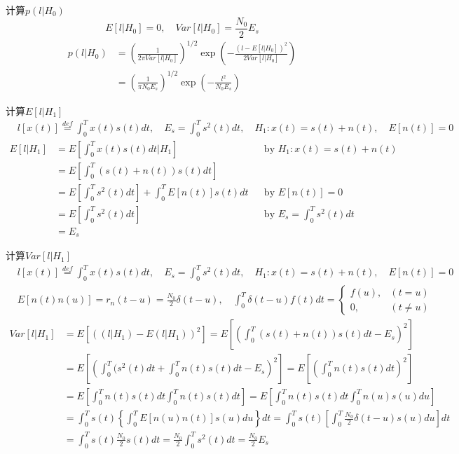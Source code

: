 \begin{frame}{计算$p(l|H_0)$}
\[ E[l|H_0]=0,\quad Var[l|H_0]=\frac{N_0}{2}E_s \]
\begin{align*}
p(l|H_0)&=\left(\frac{1}{2\pi Var[l|H_0]}\right)^{1/2}\exp\left(-\frac{(l-E[l|H_0])^2}{2Var[l|H_0]}\right)\\
&=\left(\frac{1}{\pi N_0E_s}\right)^{1/2}\exp\left(-\frac{l^2}{N_0E_s}\right)
\end{align*}
\end{frame}

\begin{frame}[shrink]{计算$E[l|H_1]$}
\begin{align*}
&l[x(t)]\mathop{=}\limits^{def}\int_{0}^{T}x(t)s(t)dt,\quad E_s=\int_{0}^{T}s^2(t)dt,\quad H_1:x(t)=s(t)+n(t), \quad E[n(t)]=0
\end{align*}
\begin{align*}
E[l|H_1]&=E\left[\int_{0}^{T}x(t)s(t)dt|H_1\right] &&\text{by }H_1: x(t)=s(t)+n(t)\\
&=E\left[\int_{0}^{T}(s(t)+n(t))s(t)dt\right]\\
&=E\left[\int_{0}^{T}s^2(t)dt\right]+\int_{0}^{T}E[n(t)]s(t)dt &&\text{by } E[n(t)]=0 \\
&=E\left[\int_{0}^{T}s^2(t)dt\right] &&\text{by } E_s=\int_{0}^{T}s^2(t)dt\\
&=E_s
\end{align*}
\end{frame}

\begin{frame}[shrink]{计算$Var[l|H_1]$}
\begin{align*}
&l[x(t)]\mathop{=}\limits^{def}\int_{0}^{T}x(t)s(t)dt,\quad E_s=\int_{0}^{T}s^2(t)dt,\quad H_1:x(t)=s(t)+n(t), \quad E[n(t)]=0\\
&E[n(t)n(u)]=r_n(t-u)=\frac{N_0}{2}\delta(t-u), \quad
\int_0^T\delta(t-u)f(t)dt=
\begin{cases}
f(u), & (t=u)\\
0, & (t\ne u) 
\end{cases}
\end{align*}
\begin{align*}
Var[l|H_1]&=E[((l|H_1)-E(l|H_1))^2]=E\left[\left(\int_{0}^{T}(s(t)+n(t))s(t)dt-E_s\right)^2\right]\\
&=E\left[\left(\int_{0}^{T}(s^2(t)dt+\int_{0}^{T}n(t)s(t)dt-E_s\right)^2\right]=E\left[\left(\int_{0}^{T}n(t)s(t)dt\right)^2\right]\\
&=E\left[\int_{0}^{T}n(t)s(t)dt\int_{0}^{T}n(t)s(t)dt\right]=E\left[\int_{0}^{T}n(t)s(t)dt\int_{0}^{T}n(u)s(u)du\right]\\
&=\int_{0}^{T}s(t)\left\{\int_{0}^{T}E[n(u)n(t)]s(u)du\right\}dt=\int_{0}^{T}s(t)\left[\int_{0}^{T}\frac{N_0}{2}\delta(t-u)s(u)du\right]dt\\
&=\int_{0}^{T}s(t)\frac{N_0}{2}s(t)dt=\frac{N_0}{2}\int_{0}^{T}s^2(t)dt=\frac{N_0}{2}E_s
\end{align*}
\end{frame}

